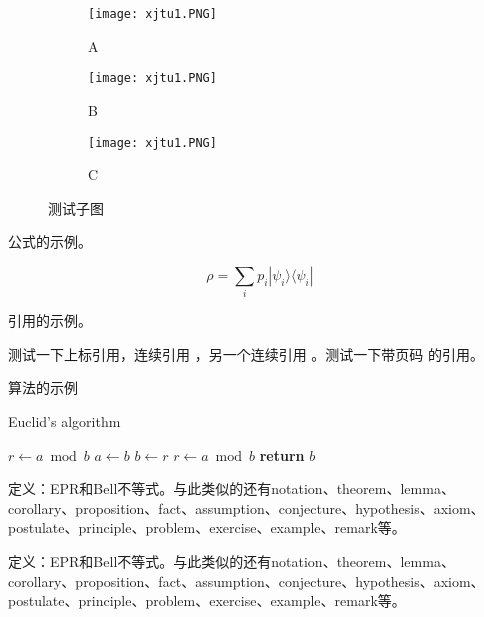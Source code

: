 \documentclass[Mac]{xjtuBSThesis}  %
\begin{document}
\begin{figure}[ht!]
    \centering
    \begin{subfigure}{.3\textwidth}
        \centering
        \texttt{[image: xjtu1.PNG]}
        \caption{A}
    \end{subfigure}
    \begin{subfigure}{.3\textwidth}
        \centering
        \texttt{[image: xjtu1.PNG]}
        \caption{B}
    \end{subfigure}
    \begin{subfigure}{.3\textwidth}
        \centering
        \texttt{[image: xjtu1.PNG]}
        \caption{C}
    \end{subfigure}
    \caption{测试子图}
\end{figure}


公式的示例。

\begin{equation}
\rho = \sum_i p_i  |\psi_i \rangle \langle \psi_i |
\end{equation}

引用的示例。

测试一下上标引用，连续引用
\cite{newman2001random,aiello2000random,bollobas2001random}，另一个连续引用
\cite{newman2001random,bollobas2001random,barabasi1999emergence}。测试一下带页码
的引用\cite[124--128]{erdHos1961strength}。

算法的示例

\begin{algorithm}
    \caption{Euclid’s algorithm}
    \label{alg:euclid}
    \begin{algorithmic}[1]
        \State $r\gets a\bmod b$
        \State $a\gets b$
        \State $b\gets r$
        \State $r\gets a\bmod b$
        \EndWhile\label{euclidendwhile}
       \State \textbf{return} $b$
       \EndProcedure
   \end{algorithmic}
\end{algorithm}


\begin{definition}
定义：EPR和Bell不等式。与此类似的还有notation、theorem、lemma、corollary、proposition、fact、assumption、conjecture、hypothesis、axiom、postulate、principle、problem、exercise、example、remark等。
\end{definition}
\begin{theorem}
定义：EPR和Bell不等式。与此类似的还有notation、theorem、lemma、corollary、proposition、fact、assumption、conjecture、hypothesis、axiom、postulate、principle、problem、exercise、example、remark等。
\end{theorem}
\end{document}
